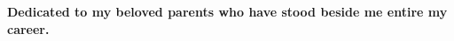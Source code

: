 \thispagestyle{empty}
    \null{}
        
        \begin{center}
        \textbf{Dedicated to my beloved parents who have stood beside me entire my career.}
        \end{center}
\null